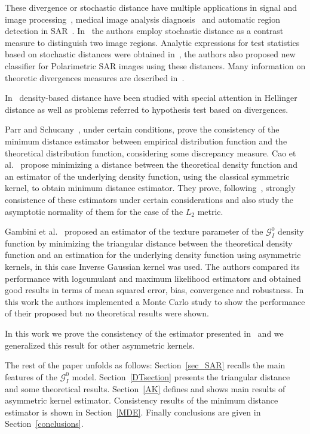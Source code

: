 \documentclass[journal]{IEEEtran}
\numberwithin{equation}{section}
\begin{document}
These divergence or stochastic distance have multiple applications in signal and image processing~\cite{4218961}, medical image analysis diagnosis~\cite{5599869} and automatic region detection in SAR~\cite{EdgeDetectionDistancesEntropiesJSTARS,SARSegmentationLevelSetGA0}. In~\cite{5208318} the authors employ stochastic distance as a contrast measure to distinguish two image regions. Analytic expressions for test statistics based on stochastic distances were obtained in~\cite{ClassificationPolSARSegmentsMinimizationWishartDistances}, the authors also proposed new classifier for Polarimetric SAR images using these distances. Many information on theoretic divergences measures are described in~\cite{Liese2006}.

In~\cite{Basu2011} density-based distance have been studied with special attention in Hellinger distance as well as problems referred to hypothesis test based on divergences.

Parr and Schucany~\cite{parr1982}, under certain conditions, prove the consistency of the minimum distance estimator between empirical distribution function and the theoretical distribution function, considering some discrepancy measure. Cao et al.~\cite{cao1995minimum} propose minimizing a distance between the theoretical density function and an estimator of the underlying density function, using the classical symmetric kernel,  to obtain minimum distance estimator. They prove, following~\cite{parr1982}, strongly consistence of these estimators under certain considerations and also study the asymptotic normality of them for the case of the $L_2$ metric. 

Gambini et al.~\cite{gambini2015} proposed an estimator of the texture parameter of the $\mathcal{G}_I^0$ density function by  minimizing the triangular distance between the theoretical density function  and an estimation for the underlying density function using asymmetric kernels, in this case Inverse Gaussian kernel was used. The authors compared its performance with logcumulant and maximum likelihood estimators and obtained good results in terms of mean squared error, bias, convergence and robustness. In this work the authors implemented a Monte Carlo study to show the performance of their proposed but no theoretical results were shown.

In this work we prove the consistency of the estimator presented in~\cite{gambini2015} and we generalized this result for other asymmetric kernels.

The rest of the paper unfolds as follows: 
Section~\ref{sec_SAR} recalls the main features of the $\mathcal{G}_I^0$ model.
Section~\ref{DTsection} presents the triangular distance and some theoretical results. 
Section~\ref{AK} defines and shows main results of asymmetric kernel estimator.
Consistency results of the minimum distance estimator is shown in Section~\ref{MDE}. Finally conclusions are given in Section~\ref{conclusions}.
\end{document}
